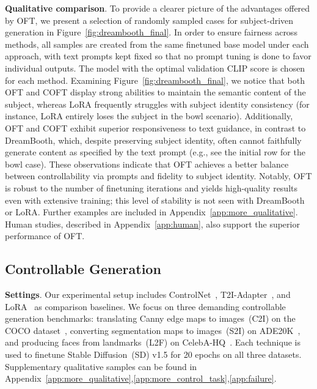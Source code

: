 \textbf{Qualitative comparison}. To provide a clearer picture of the advantages offered by OFT, we present a selection of randomly sampled cases for subject-driven generation in Figure~\ref{fig:dreambooth_final}. In order to ensure fairness across methods, all samples are created from the same finetuned base model under each approach, with text prompts kept fixed so that no prompt tuning is done to favor individual outputs. The model with the optimal validation CLIP score is chosen for each method. Examining Figure~\ref{fig:dreambooth_final}, we notice that both OFT and COFT display strong abilities to maintain the semantic content of the subject, whereas LoRA frequently struggles with subject identity consistency (for instance, LoRA entirely loses the subject in the bowl scenario). Additionally, OFT and COFT exhibit superior responsiveness to text guidance, in contrast to DreamBooth, which, despite preserving subject identity, often cannot faithfully generate content as specified by the text prompt (e.g., see the initial row for the bowl case). These observations indicate that OFT achieves a better balance between controllability via prompts and fidelity to subject identity. Notably, OFT is robust to the number of finetuning iterations and yields high-quality results even with extensive training; this level of stability is not seen with DreamBooth or LoRA. Further examples are included in Appendix~\ref{app:more_qualitative}. Human studies, described in Appendix~\ref{app:human}, also support the superior performance of OFT.

\subsection{Controllable Generation}

\textbf{Settings}. Our experimental setup includes ControlNet~\cite{zhang2023adding}, T2I-Adapter~\cite{mou2023t2i}, and LoRA~\cite{hulora2022} as comparison baselines. We focus on three demanding controllable generation benchmarks: translating Canny edge maps to images~(C2I) on the COCO dataset~\cite{lin2014microsoft}, converting segmentation maps to images~(S2I) on ADE20K~\cite{zhou2017scene}, and producing faces from landmarks~(L2F) on CelebA-HQ~\cite{karras2018progressive,xia2021tedigan}. Each technique is used to finetune Stable Diffusion~(SD) v1.5 for 20 epochs on all three datasets. Supplementary qualitative samples can be found in Appendix~\ref{app:more_qualitative},\ref{app:more_control_task},\ref{app:failure}.


